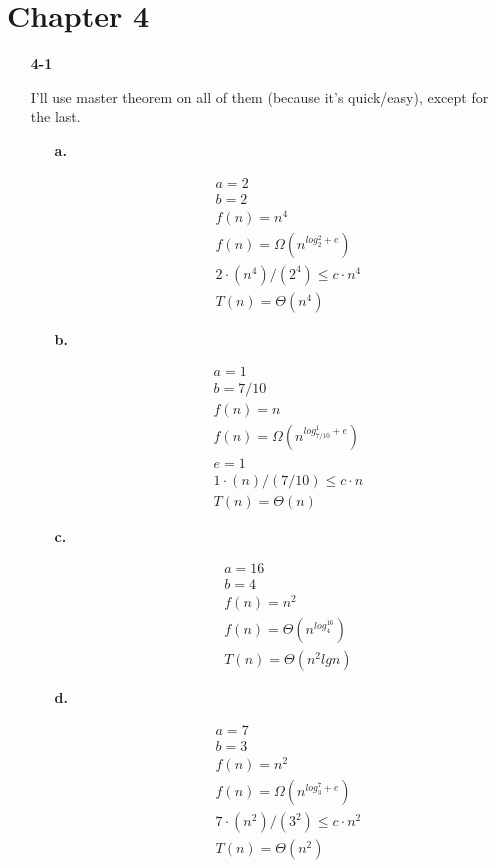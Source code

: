\documentclass{article}
\begin{document}
\section*{Chapter 4}
\begin{enumerate}

\item[\textbf{4-1}]

I'll use master theorem on all of them (because it's quick/easy), except for
the last.

\begin{enumerate}

\item[\textbf{a.}]

	\begin{align*}
	& a = 2 \\
	& b = 2 \\
	& f(n) = n^4 \\
	& f(n) = \Omega(n^{log_2^2 + e}) \\
	& 2 \cdot (n^4)/(2^4) \leq c \cdot n^4 \\
	& T(n) = \Theta(n^4)
	\end{align*}

\item[\textbf{b.}]

	\begin{align*}
	& a = 1 \\
	& b = 7/10 \\
	& f(n) = n \\
	& f(n) = \Omega(n^{log_{7/10}^{1} + e}) \\
	& e = 1 \\
	& 1 \cdot (n)/(7/10) \leq c \cdot n \\
	& T(n) = \Theta(n)
	\end{align*}

\item[\textbf{c.}]

	\begin{align*}
	& a = 16 \\
	& b = 4 \\
	& f(n) = n^2 \\
	& f(n) = \Theta(n^{log_4^{16}}) \\
	& T(n) = \Theta(n^2 lg n)
	\end{align*}

\item[\textbf{d.}]

	\begin{align*}
	& a = 7 \\
	& b = 3 \\
	& f(n) = n^2 \\
	& f(n) = \Omega(n^{log_3^7 + e}) \\
	& 7 \cdot (n^2)/(3^2) \leq c \cdot n^2 \\
	& T(n) = \Theta(n^2)
	\end{align*}


\end{enumerate}
\end{enumerate}
\end{document}

